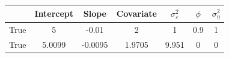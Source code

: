 \begin{tabular}{lcccccc}
\toprule
& Intercept & Slope & Covariate & $\sigma_\varepsilon^2$ & $\phi$ & $\sigma_\eta^2$ \\
\midrule
True & 5 & -0.01 & 2 & 1 & 0.9 & 1 \\
\midrule
True & 5.0099 & -0.0095 & 1.9705 & 9.951 & 0 & 0 \\
\bottomrule
\end{tabular}
